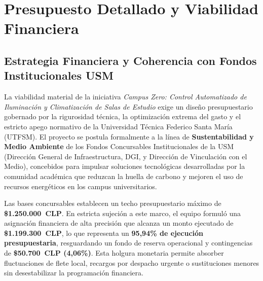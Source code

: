
\section{Presupuesto Detallado y Viabilidad Financiera}
\label{sec:presupuesto}

\subsection{Estrategia Financiera y Coherencia con Fondos Institucionales USM}

La viabilidad material de la iniciativa \textit{Campus Zero: Control Automatizado de Iluminación y Climatización de Salas de Estudio} exige un diseño presupuestario gobernado por la rigurosidad técnica, la optimización extrema del gasto y el estricto apego normativo de la Universidad Técnica Federico Santa María (UTFSM). El proyecto se postula formalmente a la línea de \textbf{Sustentabilidad y Medio Ambiente} de los Fondos Concursables Institucionales de la USM (Dirección General de Infraestructura, DGI, y Dirección de Vinculación con el Medio), concebidos para impulsar soluciones tecnológicas desarrolladas por la comunidad académica que reduzcan la huella de carbono y mejoren el uso de recursos energéticos en los campus universitarios.

Las bases concursables establecen un techo presupuestario máximo de \textbf{\$1.250.000~CLP}. En estricta sujeción a este marco, el equipo formuló una asignación financiera de alta precisión que alcanza un monto ejecutado de \textbf{\$1.199.300~CLP}, lo que representa un \textbf{95,94\% de ejecución presupuestaria}, resguardando un fondo de reserva operacional y contingencias de \textbf{\$50.700~CLP (4,06\%)}. Esta holgura monetaria permite absorber fluctuaciones de flete local, recargos por despacho urgente o sustituciones menores sin desestabilizar la programación financiera.

